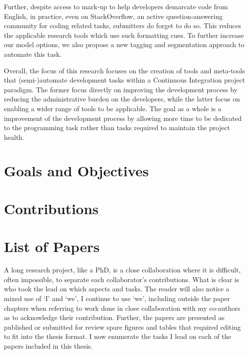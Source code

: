 Further, despite access to mark-up to help developers demarcate code from
English, in practice, even on StackOverflow, an active question-answering
community for coding related tasks, submitters do forget to do so. This reduces
the applicable research tools which use such formatting cues. To further
increase our model options, we also propose a new tagging and segmentation
approach to automate this task.

Overall, the focus of this research focuses on the creation of tools and
meta-tools that (semi-)automate development tasks within a Continuous
Integration project paradigm. The former focus directly on improving the
development process by reducing the administrative burden on the developers,
while the latter focus on enabling a wider range of tools to be applicable. The
goal as a whole is a improvement of the development process by allowing more
time to be dedicated to the programming task rather than tasks required to
maintain the project health.

\section{Goals and Objectives}
\label{chapter:introduction:sec:goals}


\section{Contributions}
\label{chapter:introduction:sec:contrib}


\section{List of Papers}
\label{chapter:introduction:sec:papers}

A long research project, like a PhD, is a close collaboration where it is
difficult, often impossible, to separate each collaborator's contributions. What
is clear is who took the lead on which aspects and tasks. The reader will also
notice a mixed use of `I' and `we', I continue to use `we', including outside
the paper chapters when referring to work done in close collaboration with my
co-authors as to acknowledge their contribution. Further, the papers are
presented as published or submitted for review spare figures and tables that
required editing to fit into the thesis format. I now enumerate the tasks I lead
on each of the papers included in this thesis.

